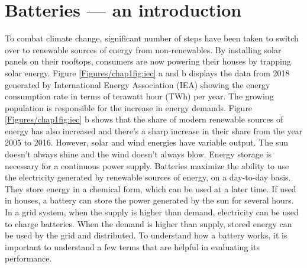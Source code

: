 \chapter{Batteries --- an introduction} %
 \label{chap1} %
\newcommand{\keyword}[1]{\textbf{#1}}
\newcommand{\tabhead}[1]{\textbf{#1}}
\newcommand{\code}[1]{\texttt{#1}}
\newcommand{\file}[1]{\texttt{\bfseries#1}}
\newcommand{\option}[1]{\texttt{\itshape#1}}

To combat climate change, significant number of steps have been taken to switch over to renewable sources of energy from non-renewables. By installing solar panels on their rooftops, consumers are now powering their houses by trapping solar energy. Figure \ref{Figures/chap1fig:iec} a and b displays the data from 2018 generated by International Energy Association (IEA) showing the energy consumption rate in terms of terawatt hour (TWh) per year. The growing population is responsible for the increase in energy demands. Figure \ref{Figures/chap1fig:iec} b shows that the share of modern renewable sources of energy has also increased and there's a sharp increase in their share from the year 2005 to 2016. However, solar and wind energies have variable output. The sun doesn't always shine and the wind doesn't always blow. Energy storage is necessary for a continuous power supply. Batteries maximize the ability to use the electricity generated by renewable sources of energy, on a day-to-day basis. They store energy in a chemical form, which can be used at a later time. If used in houses, a battery can store the power generated by the sun for several hours. In a grid system, when the supply is higher than demand, electricity can be used to charge batteries. When the demand is higher than supply, stored energy can be used by the grid and distributed. To understand how a battery works, it is important to understand a few terms that are helpful in evaluating its performance.  

